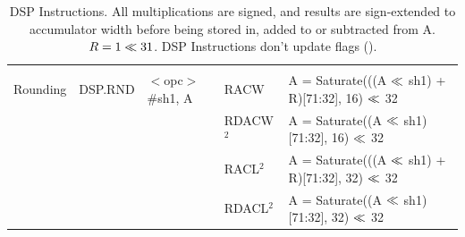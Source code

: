 \begin{table}
\begin{subtable}{\linewidth}
\begin{center}
\begin{tabular}{lllll}
                   &                   &                                       &                   &                                                                               \\
Rounding           & DSP.RND           & $<$opc$>$ \#sh1, A                    & RACW              & A = Saturate(((A $\ll$ sh1) + R)[71:32], 16) $\ll$ 32                       \\
                   &                   &                                       & RDACW$^2$         & A = Saturate((A $\ll$ sh1)[71:32], 16) $\ll$ 32                             \\
                   &                   &                                       & RACL$^2$          & A = Saturate(((A $\ll$ sh1) + R)[71:32], 32) $\ll$ 32                       \\
                   &                   &                                       & RDACL$^2$         & A = Saturate((A $\ll$ sh1)[71:32], 32) $\ll$ 32                             \\ \hline
\end{tabular}
\end{center}
\captionsetup{font=scriptsize, labelfont=scriptsize}
\caption{DSP Instructions. All multiplications are signed, and results are sign-extended to 
accumulator width before being stored in, added to or subtracted from A. $R = 1 \ll 31$.
DSP Instructions don't update flags (\flags{----}).}
\end{subtable}

\vspace{0.5cm}


\end{table}
